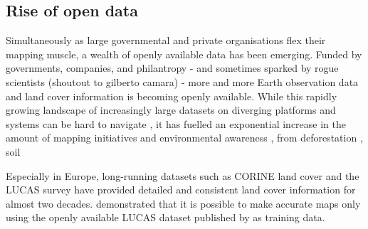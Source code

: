     \subsection*{Rise of open data}
    
    Simultaneously as large governmental and private organisations flex their mapping muscle, a wealth of openly available data has been emerging. Funded by governments, companies, and philantropy - and sometimes sparked by rogue scientists (shoutout to gilberto camara) - more and more Earth observation data and land cover information is becoming openly available. While this rapidly growing landscape of increasingly large datasets on diverging platforms and systems can be hard to navigate \citep{wagemann2021a}, it has fuelled an exponential increase in the amount of mapping initiatives and environmental awareness \citep{wulder2022fifty}, from deforestation \citep{hansen2013high}, soil \citep{hengl2017soilgrids250m}
    
    Especially in Europe, long-running datasets such as CORINE land cover and the LUCAS survey have provided detailed and consistent land cover information for almost two decades. \citet{pflugmacher2019mapping} demonstrated that it is possible to make accurate maps only using the openly available LUCAS dataset published by \citet{dandrimont2020harmonised} as training data.


    
